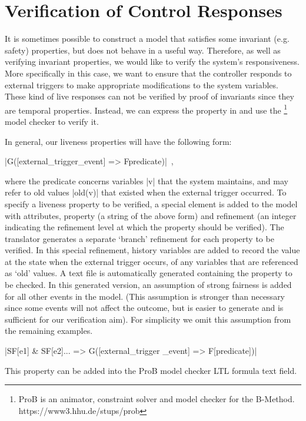 

\section{Verification of Control Responses}
\label{sec:verificationResponses}
It is sometimes possible to construct a model that satisfies some invariant (e.g. safety) properties, but does not behave in a useful way.
Therefore, as well as verifying invariant properties, we would like to verify the system's responsiveness.  More specifically in this case, we want to ensure that the controller responds to external triggers to make appropriate modifications to the system variables. 
These kind of live responses can not be verified by proof of invariants since they are temporal properties.
Instead, we can express the property in \LTL  and use the \PROB\footnote{ProB is an animator, constraint solver and model checker for the B-Method. https://www3.hhu.de/stups/prob} model checker to verify it.

In general, our liveness properties will have the following form:
\begin{center}
  |G([external_trigger_event] => F{predicate})|~,
\end{center}
where the predicate concerns variables |v| that the system maintains, and may refer to old values |old(v)| that existed when the external trigger occurred.
To specify a liveness property to be verified, a special \LTL element is added to the \SCXML model with attributes, property (a string of the above form)  and refinement (an integer indicating the refinement level at which the property should be verified).
The translator generates a separate `branch' refinement for each \LTL property to be verified. 
In this special refinement, history variables are added to record the value at the state when the external trigger occurs, of any variables that are referenced as `old' values.
A text file is automatically generated containing the \LTL property to be checked. 
In this generated version, an assumption of strong fairness is added for all other events in the model.
(This assumption is stronger than necessary since some events will not affect the outcome, but is easier to generate and is sufficient for our verification aim). 
For simplicity we omit this assumption from the remaining examples.
\begin{center}
  |SF[e1] & SF[e2]... => G([external_trigger _event] => F[predicate])|
\end{center}
This property can be added into the ProB model checker LTL formula text field.

